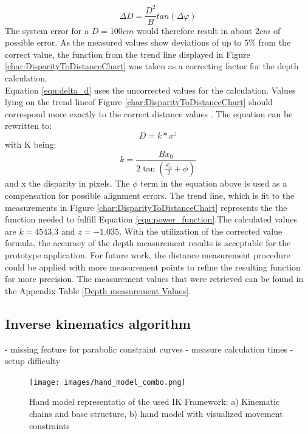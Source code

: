 \begin{equation}
\label{equ:delta_d}
\Delta D=\frac{D^{2}}{B} tan(\Delta\varphi)
\end{equation}
The system error for a $D=100cm$ would therefore result in about $2cm$ of possible error.
As the measured values show deviations of up to $5\%$ from the correct value, the function from the trend line displayed in Figure \ref{char:DisparityToDistanceChart} was taken as a correcting factor for the depth calculation.
\\Equation \ref{equ:delta_d} uses the uncorrected values for the calculation. Values lying on the trend lineof Figure \ref{char:DisparityToDistanceChart} should correspond more exactly to the correct distance values \cite{ManafA.Mahammed.2013}. The equation can be rewritten to:
\begin{equation}
\label{equ:power_function}
D=k*x^{z}
\end{equation}
with K being:
\begin{equation}
k=\frac{Bx_0}{2\tan(\frac{\varphi_0}{2}+\phi)}
\end{equation}
and x the disparity in pixels.
The $\phi$ term in the equation above is used as a compensation for possible alignment errors.
The trend line, which is fit to the measurements in Figure \ref{char:DisparityToDistanceChart} represents the the function needed to fulfill Equation \ref{equ:power_function}.The calculated values are $k=4543.3$ and $z=-1.035$.
With the utilization of the corrected value formula, the accuracy of the depth measurement results is acceptable for the prototype application. For future work, the distance measurement procedure could be applied with more measurement points to refine the resulting function for more precision. The measurement values that were retrieved can be found in the Appendix Table \ref{Depth measurement Values}.
\subsection{Inverse kinematics algorithm}
- missing feature for parabolic constraint curves
- measure calculation times 
- setup difficulty
\begin{figure}[H]
\centering
\texttt{[image: images/hand\_model\_combo.png]}
\caption{Hand model representatio of the used IK Framework: a) Kinematic chains and base structure, b) hand model with visualized movement constraints}
\label{img:netzwerk_diagram} 
\end{figure}


